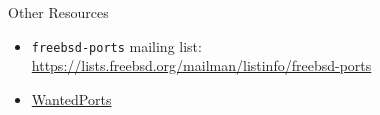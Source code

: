 \documentclass[aspectratio=169]{beamer}
\begin{document}
\begin{frame}[t,fragile]{Other Resources}
  \begin{itemize}
    \item \verb`freebsd-ports` mailing list: \href{https://lists.freebsd.org/mailman/listinfo/freebsd-ports}{https://lists.freebsd.org/mailman/listinfo/freebsd-ports}
    \item \href{https://wiki.freebsd.org/WantedPorts}{WantedPorts}
  \end{itemize}
\end{frame}
\end{document}
